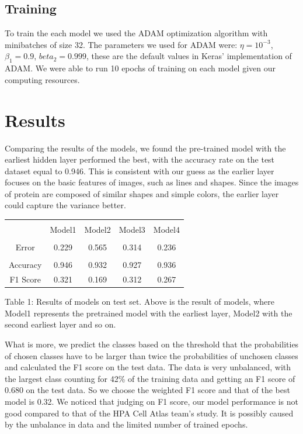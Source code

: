 \documentclass{article}
\begin{document}
\subsection{Training}
To train the each model we used the ADAM optimization algorithm\cite{kingma2014adam} with minibatches of size 32.
The parameters we used for ADAM were: $\eta = 10^{-3}$, $\beta_1 = 0.9$, $beta_2=0.999$, these
are the default values in Keras' implementation of ADAM.
We were able to run 10 epochs of training on each model given our computing resources. 
\section{Results}
Comparing the results of the models, we found the pre-trained model with the earliest hidden layer performed the best, with the accuracy rate on the test dataset equal to 0.946. This is consistent with our guess as the earlier layer focuses on the basic features of images, such as lines and shapes. Since the images of protein are composed of similar shapes and simple colors, the earlier layer could capture the variance better. 

\begin{table}[ht]
\centering

\begin{tabular}{|c|c|c|c|c|}
    \hline\\
     &Model1 & Model2&Model3&Model4 \\
     \hline\\
     Error&0.229&0.565&0.314&0.236\\
     \hline\\
     Accuracy&0.946&0.932&0.927&0.936\\
      \hline
     F1 Score&0.321&0.169&0.312&0.267\\
     \hline
\end{tabular}

{\raggedright Table 1: Results of models on test set. Above is the result of models, where Model1 represents the pretrained model with the earliest layer, Model2 with the second earliest layer and so on. \par}

\label{table:1}
\end{table}

What is more, we predict the classes based on the threshold that the probabilities of chosen classes have to be larger than twice the probabilities of unchosen classes and calculated the F1 score on the test data. The data is very unbalanced, with the largest class counting for 42\% of the training data and getting an F1 score of 0.680 on the test data. So we choose the weighted F1 score and that of the best model is 0.32. We noticed that judging on F1 score, our model performance is not good compared to that of the HPA Cell Atlas team's study. It is possibly caused by the unbalance in data and the limited number of trained epochs.
\end{document}
